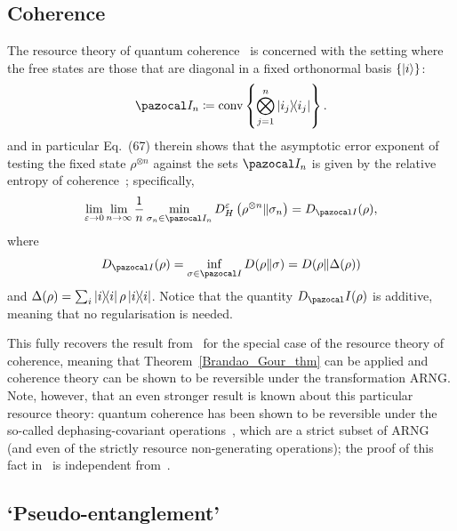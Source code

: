 \documentclass[11pt,notitlepage,tightenlines,nofootinbib,superscriptaddress]{revtex4-1}
\begin{document}

\subsection{Coherence}

The resource theory of quantum coherence~\cite{Baumgraz2014,coherence-review} is concerned with the setting where the free states are those that are diagonal in a fixed orthonormal basis $\{\ket{i}\}$:
\begin{equation}\begin{aligned}
    \II_n \coloneqq \co \left\{ \bigotimes_{j=1}^n \ketbra{i_j} \right\}.
\end{aligned}\end{equation}
\cite[Section 3.1]{berta_composite} and in particular %
Eq.~(67) therein shows that the asymptotic error exponent of testing the fixed state $\rho^{\otimes n}$ against the sets $\II_n$ is given by the relative entropy of coherence~\cite{Baumgraz2014}; specifically,
\begin{align}
\lim_{\epsilon \to 0} \lim_{n \to \infty} \frac1n \min_{\sigma_n \in \II_n} D^\epsilon_H \left(\rho^{\otimes n} \| \sigma_n \right) = D_{\II}(\rho),
\end{align}
where
\begin{align}
D_{\II}(\rho)=\inf_{\sigma\in \II}D(\rho\|\sigma) = D(\rho \| \Delta(\rho))
\end{align}
and $\Delta(\rho) = \sum_i \ket{i}\!\!\bra{i}\rho\ket{i}\!\!\bra{i}$. Notice that the quantity $D_\II(\rho)$ is additive, meaning that no regularisation is needed.

This fully recovers the result from~\cite{Brandao2010} for the special case of the resource theory of coherence, meaning that Theorem~\ref{Brandao_Gour_thm} can be applied and coherence theory can be shown to be reversible under the transformation ARNG. Note, however, that an even stronger result is known about this particular resource theory: quantum coherence has been shown to be reversible under the so-called dephasing-covariant operations~\cite{Chitambar-reversible}, which are a strict subset of ARNG (and even of the strictly resource non-generating operations); the proof of this fact in~\cite{Chitambar-reversible} is independent from~\cite{Brandao2010}.



\subsection{`Pseudo-entanglement'}\label{pseudo_entanglement_sec}
\end{document}
